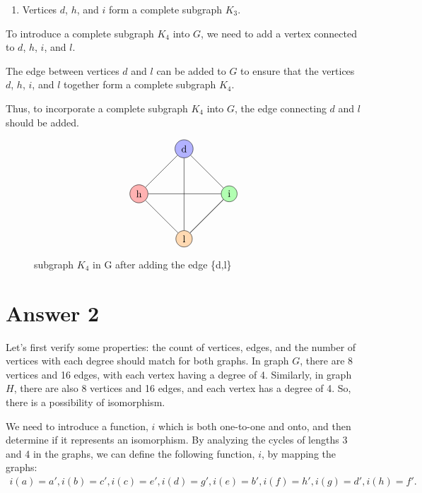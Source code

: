 \documentclass[12pt]{article}
\begin{document}
\begin{enumerate}
    \item Vertices \( d \), \( h \), and \( i \) form a complete subgraph \( K_3 \).
\end{enumerate}

To introduce a complete subgraph \( K_4 \) into \( G \), we need to add a vertex connected to \( d \), \( h \), \( i \), and \( l \).

The edge between vertices \( d \) and \( l \) can be added to \( G \) to ensure that the vertices \( d \), \( h \), \( i \), and \( l \) together form a complete subgraph \( K_4 \).

Thus, to incorporate a complete subgraph \( K_4 \) into \( G \), the edge connecting \( d \) and \( l \) should be added.

\begin{figure}[H] 
    \[
\begin{tikzpicture}[scale=0.8]

    \node[circle,draw,fill=blue!30] (d) at (0,2) {d};
    \node[circle,draw,fill=red!30] (h) at (-2,0) {h};
    \node[circle,draw,fill=green!30] (i) at (2,0) {i};
    \node[circle,draw,fill=orange!30] (l) at (0,-2) {l};

    \draw (d) -- (h) -- (l) -- (i) -- (d) -- (l) -- (i) -- (h);

\end{tikzpicture}
\]
\caption{subgraph \(K_4\) in G after adding the edge \{d,l\}}
\end{figure}

\section*{Answer 2}

Let's first verify some properties: the count of vertices, edges, and the number of vertices with each degree should match for both graphs. In graph \( G \), there are 8 vertices and 16 edges, with each vertex having a degree of 4. Similarly, in graph \( H \), there are also 8 vertices and 16 edges, and each vertex has a degree of 4. So, there is a possibility of isomorphism.

We need to introduce a function, \( i \) which is both one-to-one and onto, and then determine if it represents an isomorphism. By analyzing the cycles of lengths 3 and 4 in the graphs, we can define the following function, \( i \), by mapping the graphs: 
\begin{align*}
    i(a) = a',
    i(b) = c',
    i(c) = e', 
    i(d) = g', 
    i(e) = b', 
    i(f) = h', 
    i(g) = d', 
    i(h) = f'.
\end{align*}
\end{document}
